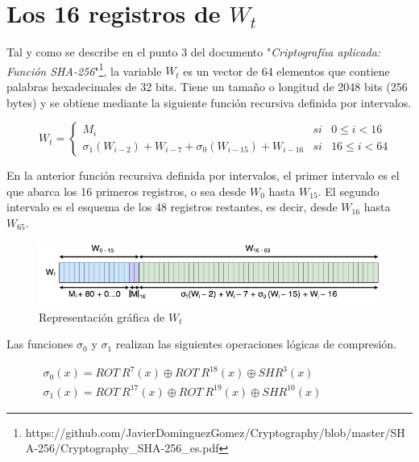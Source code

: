 \documentclass{article}
\begin{document}
\section{Los 16 registros de $W_t$}
    Tal y como se describe en el punto 3 del documento "\textit{Criptografíıa aplicada: Función SHA-256}"\footnote{https://github.com/JavierDominguezGomez/Cryptography/blob/master/SHA-256/Cryptography\_SHA-256\_es.pdf}, la variable $W_{t}$ es un vector de 64 elementos que contiene palabras hexadecimales de 32 bits. Tiene un tamaño o longitud de 2048 bits (256 bytes) y se obtiene mediante la siguiente función recursiva definida por intervalos.
        \begin{figure}[H]
        \centering
            $W_{t} = \left \{
            \begin{array}{lcl}
                M_{i} & si & 0 \le i < 16 \\
                \sigma_{1}(W_{i-2})+W_{i-7}+\sigma_{0}(W_{i-15})+W_{i-16} & si & 16 \le i < 64
            \end{array}
            \right .$
        \end{figure}
    En la anterior función recursiva definida por intervalos, el primer intervalo es el que abarca los 16 primeros registros, o sea desde $W_{0}$ hasta $W_{15}$. El segundo intervalo es el esquema de los 48 registros restantes, es decir, desde $W_{16}$ hasta $W_{65}$.
        \begin{figure}[H]
        \centering
            \includegraphics[scale=0.5]{img/SHA-256-Wt.png}
            \caption{Representación gráfica de $W_{t}$}
        \end{figure}
    Las funciones  $\sigma_{0}$ y $\sigma_{1}$ realizan las siguientes operaciones lógicas de compresión.
        \begin{figure}[H]
        \centering
            $\begin{array}{l}
                \sigma_{0}(x) = ROT \ R^{7}(x) \oplus ROT \ R^{18}(x) \oplus SHR^{3}(x) \\
                \sigma_{1}(x) = ROT \ R^{17}(x) \oplus ROT \ R^{19}(x) \oplus SHR^{10}(x)
            \end{array}$
        \end{figure}
    
\end{document}
